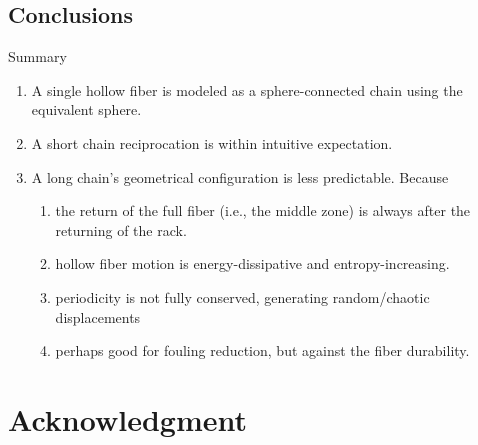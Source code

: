 \documentclass[t,presentation]{beamer}
\begin{document}
\subsection{Conclusions}
\label{sec:org106c3c1}
\begin{frame}[label={sec:orgcfdb9fe}]{Summary}
\begin{enumerate}
\item A single hollow fiber is modeled as a sphere-connected chain using the equivalent sphere.
\item A short chain reciprocation is within intuitive expectation.
\item A long chain's geometrical configuration is less predictable. Because
\begin{enumerate}
\item the return of the full fiber (i.e., the middle zone) is always after the returning of the rack.
\item hollow fiber motion is energy-dissipative and entropy-increasing.
\item periodicity is not fully conserved, generating random/chaotic displacements
\item perhaps good for fouling reduction, but against the fiber durability.
\end{enumerate}
\end{enumerate}
\end{frame}

\section{Acknowledgment}
\label{sec:org2de8b9b}
\end{document}
